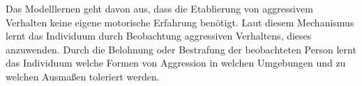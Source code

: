 Das Modelllernen geht davon aus, dass die Etablierung von aggressivem Verhalten keine eigene
motorische Erfahrung benötigt. Laut diesem Mechanismus lernt das Individuum durch Beobachtung
aggressiven Verhaltens, dieses anzuwenden. Durch die Belohnung oder Bestrafung der beobachteten 
Person lernt das Individuum welche Formen von Aggression in welchen Umgebungen und zu welchen 
Ausmaßen toleriert werden. %